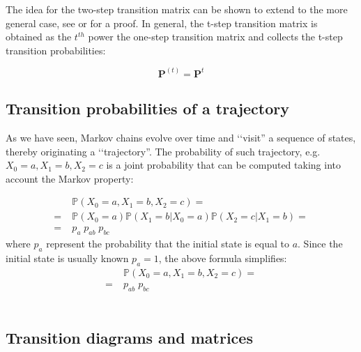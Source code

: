 \documentclass[\main/main.tex]{subfiles}
\begin{document}
The idea for the two-step transition matrix can be shown to extend to the more general case, see \citep{Sheskin2010} or \cite{Holmes2015} for a proof. In general, the t-step transition matrix is obtained as the  $t^{th}$ power the one-step transition matrix and collects the t-step transition probabilities:

\begin{equation}
    \mathbf{P}^{(t)} = \mathbf{P}^t
\end{equation}













\subsection{Transition probabilities of a trajectory}

\noindent As we have seen, Markov chains evolve over time and \lq\lq visit'' a sequence of states, thereby originating a \lq\lq trajectory''. The probability of such trajectory, e.g. $X_0 = a, X_1 = b, X_2 = c$ is a joint probability that can be computed taking into account the Markov property:

\begin{equation}
\begin{split}
   &\mathds{P}(X_0 = a, X_1 = b, X_2 = c) =\\
   =\;  &\mathds{P}(X_0 = a) \mathds{P}(X_1 = b |X_0 = a ) \mathds{P}(X_2 = c |X_1 = b ) = \\
   =\; &p_a \; p_{ab}\; p_{bc}
\end{split}
\end{equation}
where $p_a$ represent the probability that the initial state is equal to $a$. Since the initial state is usually known $p_a = 1$, the above formula simplifies:
\begin{equation}
\begin{split}
   &\mathds{P}(X_0 = a, X_1 = b, X_2 = c) =\\
   =\; &p_{ab}\; p_{bc}
\end{split}
\end{equation}\\










\subsection{Transition diagrams and matrices}
\end{document}
